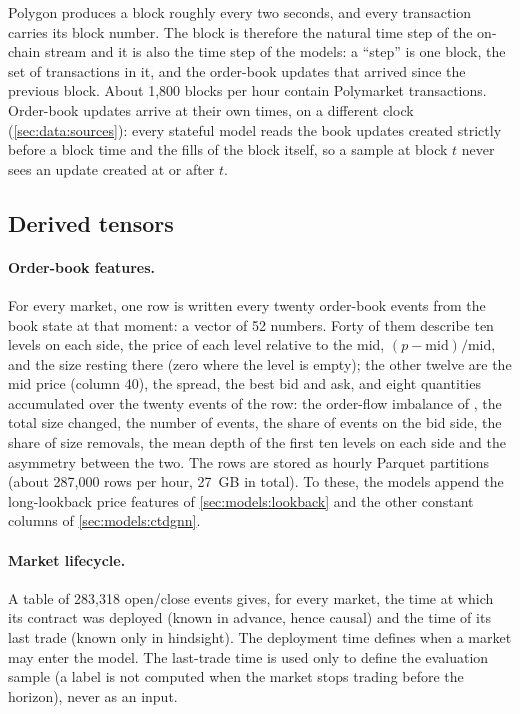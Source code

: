 Polygon produces a block roughly every two seconds, and every transaction carries its
block number.  The block is therefore the natural time step of the on-chain stream and
it is also the time step of the models: a ``step'' is one block, the set of transactions
in it, and the order-book updates that arrived since the previous block.  About 1{,}800
blocks per hour contain Polymarket transactions.  Order-book updates arrive at their own
times, on a different clock (\cref{sec:data:sources}): every stateful model reads the book
updates created strictly before a block time and the fills of the block itself, so a
sample at block $t$ never sees an update created at or after $t$.

\subsection{Derived tensors}
\label{sec:data:tensors}

\paragraph{Order-book features.}  For every market, one row is written every twenty
order-book events from the book state at that moment: a vector of 52 numbers.  Forty of
them describe ten levels on each side, the price of each level relative to the mid,
$(p - \mathrm{mid})/\mathrm{mid}$, and the size resting there (zero where the level is
empty); the other twelve are the mid price (column 40), the spread, the best bid and ask,
and eight quantities accumulated over the twenty events of the row: the order-flow imbalance
of \textcite{cont2014price}, the total size changed, the number of events, the share of
events on the bid side, the share of size removals, the mean depth of the first ten levels
on each side and the asymmetry between the two.  The rows are stored as hourly Parquet
partitions (about 287{,}000 rows per hour, 27~GB in total).  To these, the models append
the long-lookback price features of \cref{sec:models:lookback} and the other constant
columns of \cref{sec:models:ctdgnn}.


\paragraph{Market lifecycle.}  A table of 283{,}318 open/close events gives, for every
market, the time at which its contract was deployed (known in advance, hence causal)
and the time of its last trade (known only in hindsight).  The deployment time defines
when a market may enter the model.  The last-trade time is used only to define the
evaluation sample (a label is not computed when the market stops trading before the
horizon), never as an input.

